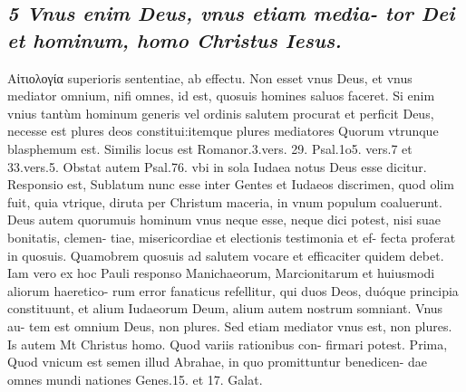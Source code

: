 \documentclass{article}
\begin{document}
\begin{pages}
\subsection*{\textit{5 Vnus enim Deus, vnus etiam media- tor Dei et hominum, homo Christus Iesus. }}\pstart Αἰτιολογία superioris sententiae, ab effectu. Non esset vnus Deus, et vnus mediator omnium, nifi omnes, id est, quosuis homines saluos faceret. Si enim vnius tantùm hominum generis vel ordinis salutem procurat et perficit Deus, necesse est plures deos constitui:itemque plures mediatores Quorum vtrunque blasphemum est.  \pend\pstart Similis locus est Romanor.3.vers. 29. Psal.1o5. vers.7 et 33.vers.5.  \pend\pstart Obstat autem Psal.76. vbi in sola Iudaea notus Deus esse dicitur. Responsio est, Sublatum nunc esse inter Gentes et Iudaeos discrimen, quod olim fuit, quia vtrique, diruta per Christum maceria, in vnum populum coaluerunt.  \pend\pstart Deus autem quorumuis hominum vnus neque  esse, neque dici potest, nisi suae bonitatis, clemen- tiae, misericordiae et electionis testimonia et ef- fecta proferat in quosuis. Quamobrem quosuis ad salutem vocare et efficaciter quidem debet.  \pend\pstart Iam vero ex hoc Pauli responso Manichaeorum, Marcionitarum et huiusmodi aliorum haeretico- rum error fanaticus refellitur, qui duos Deos, duóque principia constituunt, et alium Iudaeorum Deum, alium autem nostrum somniant. Vnus au- tem est omnium Deus, non plures.  \pend\pstart Sed etiam mediator vnus est, non plures. Is autem Mt Christus homo. Quod variis rationibus con- firmari potest. Prima, Quod vnicum est semen illud Abrahae, in quo promittuntur benedicen- dae omnes mundi nationes Genes.15. et 17. Galat.  \pend

\end{pages}
\end{document}
